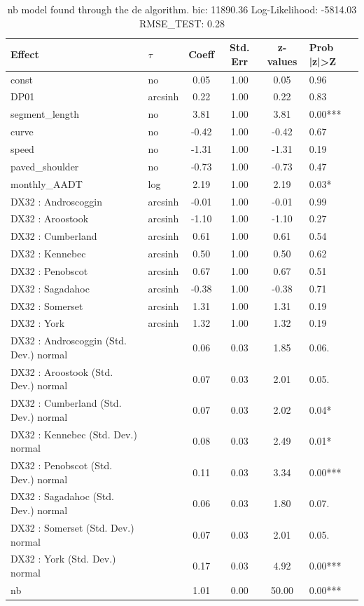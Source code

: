 \begin{table}
	\caption{nb model found through the de algorithm. bic: 11890.36 Log-Likelihood: -5814.03 RMSE_TEST: 0.28}
	\begin{center}
		\begin{tabular}{|l|l|c|c|c|l|}
			\hline
			Effect & $\tau$ & Coeff & Std. Err & z-values & Prob |z|>Z \\
			\hline
			const & no & 0.05 & 1.00 & 0.05 & 0.96 \\
			\hline
			DP01 & arcsinh & 0.22 & 1.00 & 0.22 & 0.83 \\
			\hline
			segment_length & no & 3.81 & 1.00 & 3.81 & 0.00*** \\
			\hline
			curve & no & -0.42 & 1.00 & -0.42 & 0.67 \\
			\hline
			speed & no & -1.31 & 1.00 & -1.31 & 0.19 \\
			\hline
			paved_shoulder & no & -0.73 & 1.00 & -0.73 & 0.47 \\
			\hline
			monthly_AADT & log & 2.19 & 1.00 & 2.19 & 0.03* \\
			\hline
			DX32 : Androscoggin & arcsinh & -0.01 & 1.00 & -0.01 & 0.99 \\
			\hline
			DX32 : Aroostook & arcsinh & -1.10 & 1.00 & -1.10 & 0.27 \\
			\hline
			DX32 : Cumberland & arcsinh & 0.61 & 1.00 & 0.61 & 0.54 \\
			\hline
			DX32 : Kennebec & arcsinh & 0.50 & 1.00 & 0.50 & 0.62 \\
			\hline
			DX32 : Penobscot & arcsinh & 0.67 & 1.00 & 0.67 & 0.51 \\
			\hline
			DX32 : Sagadahoc & arcsinh & -0.38 & 1.00 & -0.38 & 0.71 \\
			\hline
			DX32 : Somerset & arcsinh & 1.31 & 1.00 & 1.31 & 0.19 \\
			\hline
			DX32 : York & arcsinh & 1.32 & 1.00 & 1.32 & 0.19 \\
			\hline
			DX32 : Androscoggin (Std. Dev.) normal &  & 0.06 & 0.03 & 1.85 & 0.06. \\
			\hline
			DX32 : Aroostook (Std. Dev.) normal &  & 0.07 & 0.03 & 2.01 & 0.05. \\
			\hline
			DX32 : Cumberland (Std. Dev.) normal &  & 0.07 & 0.03 & 2.02 & 0.04* \\
			\hline
			DX32 : Kennebec (Std. Dev.) normal &  & 0.08 & 0.03 & 2.49 & 0.01* \\
			\hline
			DX32 : Penobscot (Std. Dev.) normal &  & 0.11 & 0.03 & 3.34 & 0.00*** \\
			\hline
			DX32 : Sagadahoc (Std. Dev.) normal &  & 0.06 & 0.03 & 1.80 & 0.07. \\
			\hline
			DX32 : Somerset (Std. Dev.) normal &  & 0.07 & 0.03 & 2.01 & 0.05. \\
			\hline
			DX32 : York (Std. Dev.) normal &  & 0.17 & 0.03 & 4.92 & 0.00*** \\
			\hline
			nb &  & 1.01 & 0.00 & 50.00 & 0.00*** \\
			\hline
		\end{tabular}
	\end{center}
\end{table}